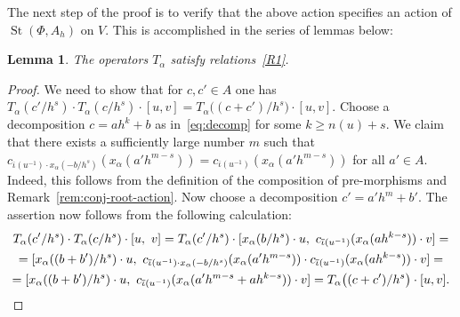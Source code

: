 \documentclass[oneside, 11pt]{amsart} \pdfoutput=1
\newcommand{\St}{\mathop{\mathrm{St}}\nolimits}
\numberwithin{equation}{section}
\newtheorem{lemma}{Lemma} \numberwithin{lemma}{section}
\theoremstyle{definition}
\begin{document}
The next step of the proof is to verify that the above action specifies an action of $\St(\Phi, A_h)$ on $V$.
This is accomplished in the series of lemmas below:

\begin{lemma}\label{lem:R1} The operators $T_\alpha$ satisfy relations~\eqref{R1}. \end{lemma}
\begin{proof}
We need to show that for $c, c' \in A$ one has $\textstyle
T_\alpha(c'/{h^s}) \cdot T_\alpha(c/h^s) \cdot [u, v] = T_\alpha\bigl((c+c')/h^s\bigr) \cdot [u, v].$
Choose a decomposition $c = ah^k + b$ as in~\eqref{eq:decomp} for some $k \geq n(u) + s$.
We claim that there exists a sufficiently large number $m$ such that $c_{\overline{\iota}(u^{-1}) \cdot x_\alpha(-b/h^s)}(x_\alpha(a'h^{m-s})) = c_{\overline{\iota}(u^{-1})}(x_\alpha(a'h^{m-s}))$ for all $a'\in A$. Indeed, this follows from the definition of the composition of pre-morphisms and Remark~\ref{rem:conj-root-action}. 
Now choose a decomposition $c' = a' h^m + b'$.
The assertion now follows from the following calculation:
\begin{multline*}
 T_\alpha(c'/{h^s}) \cdot T_\alpha(c/h^s) \cdot [u,\ v] = T_\alpha(c'/h^s) \cdot [x_\alpha(b/h^s)\cdot u,\ c_{\overline{\iota}(u^{-1})}(x_\alpha(ah^{k-s})) \cdot v] = \\
 = [x_\alpha((b + b')/h^s)\cdot u,\ c_{\overline{\iota}(u^{-1}) \cdot x_\alpha(-b/h^s)}(x_\alpha(a'h^{m-s})) \cdot c_{\overline{\iota}(u^{-1})}(x_\alpha(ah^{k-s})) \cdot v] = \\ = [x_\alpha((b + b')/h^s)\cdot u,\  c_{\overline{\iota}(u^{-1})}(x_\alpha(a'h^{m-s} + ah^{k-s})) \cdot v] = T_\alpha\bigl((c+c')/h^s\bigr) \cdot [u, v]. \qedhere
\end{multline*}
\end{proof}
\end{document}

